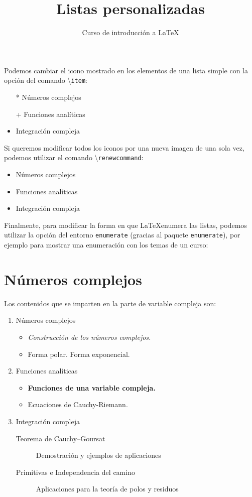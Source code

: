 \documentclass[10pt,letterpaper]{article}
\title{Listas personalizadas}
\author{Curso de introducción a LaTeX}
\begin{document}
\maketitle

Podemos cambiar el icono mostrado en los elementos de una lista simple con la opción del comando \textbackslash\texttt{item}:

\begin{itemize}
\item[*]  Números complejos
\item[+] Funciones analíticas
\item Integración compleja
\end{itemize}

Si queremos modificar todos los iconos por una nueva imagen de una sola vez, podemos utilizar el comando \textbackslash\texttt{renewcommand}:

\renewcommand{\labelitemi}{$\rightarrow$}
\begin{itemize}
\item Números complejos
\item Funciones analíticas
\item Integración compleja
\end{itemize}

Finalmente, para modificar la forma en que \LaTeX enumera las listas, podemos utilizar la opción del entorno \texttt{enumerate} (gracias al paquete \texttt{enumerate}), por ejemplo para mostrar una enumeración con los temas de un curso:

\section{Números complejos}
Los contenidos que se imparten en la parte de  variable
compleja son:

\begin{enumerate}
  \item Números complejos
     \begin{itemize}
       \item \emph{Construcción de los números complejos.}
       \item Forma polar. \textsf{Forma exponencial.}
     \end{itemize}
  \item Funciones analíticas
     \begin{itemize}
       \item \textbf{Funciones de una variable compleja.}
       \item Ecuaciones de Cauchy-Riemann.
     \end{itemize}
  \item Integración compleja
     \begin{description}
       \item[Teorema de Cauchy--Goursat] 
        Demostración y ejemplos de aplicaciones
       \item[Primitivas e Independencia del camino]
        Aplicaciones para la teoría de polos y residuos
     \end{description}
\end{enumerate}
\end{document}
